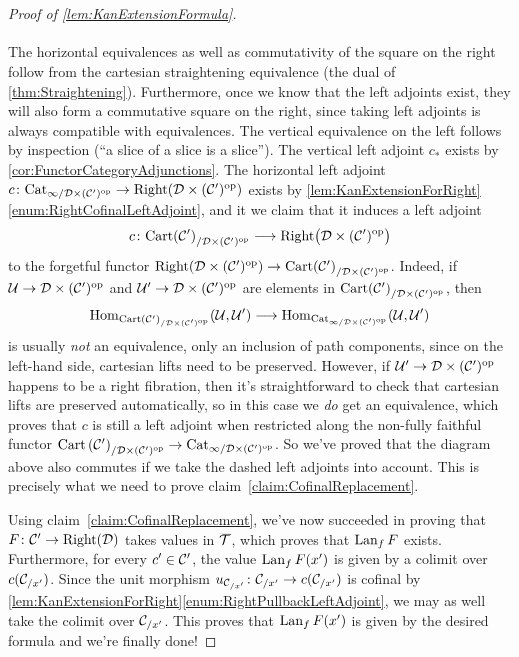 \begin{proof}[Proof of \cref{lem:KanExtensionFormula}]
\begin{equation*}
\begin{tikzcd}
		\end{tikzcd}
	\end{equation*}
	The horizontal equivalences as well as commutativity of the square on the right follow from the cartesian straightening equivalence (the dual of \cref{thm:Straightening}). Furthermore, once we know that the left adjoints exist, they will also form a commutative square on the right, since taking left adjoints is always compatible with equivalences. The vertical equivalence on the left follows by inspection (\enquote{a slice of a slice is a slice}). The vertical left adjoint $c_*$ exists by \cref{cor:FunctorCategoryAdjunctions}. The horizontal left adjoint $c\colon \Cat_{\infty/\Dd\times(\Cc')^\op}\rightarrow \cat{Right}\lef(\Dd\times(\Cc')^\op\righ)$ exists by \cref{lem:KanExtensionForRight}\cref{enum:RightCofinalLeftAdjoint}, and it we claim that it induces a left adjoint
	\begin{equation*}
		c\colon  \cat{Cart}\!\left(\Cc'\right)_{/\Dd\times(\Cc')^\op}\longrightarrow \cat{Right}\lef(\Dd\times(\Cc')^\op\righ)
	\end{equation*}
	to the forgetful functor $\cat{Right}\lef(\Dd\times(\Cc')^\op\righ)\rightarrow \cat{Cart}\!\left(\Cc'\right)_{/\Dd\times(\Cc')^\op}$. Indeed, if $\mathcal{U}\rightarrow \mathcal{D}\times(\mathcal{C}')^{\mathrm{op}}$ and $\mathcal{U}'\rightarrow \mathcal{D}\times(\mathcal{C}')^{\mathrm{op}}$ are elements in $\mathrm{Cart}\!\left(\mathcal{C}'\right)_{/\mathcal{D}\times(\mathcal{C}')^{\mathrm{op}}}$, then
	\begin{equation*}
		\operatorname{Hom}_{\mathrm{Cart}\left(\mathcal{C}'\right)_{/\mathcal{D}\times(\mathcal{C}')^{\mathrm{op}}}}(\mathcal{U},\mathcal{U}')\longrightarrow \operatorname{Hom}_{\mathrm{Cat}_{\infty/\mathcal{D}\times(\mathcal{C}')^{\mathrm{op}}}}(\mathcal{U},\mathcal{U}')
	\end{equation*}
	is usually \emph{not} an equivalence, only an inclusion of path components, since on the left-hand side, cartesian lifts need to be preserved. However, if $\mathcal{U}'\rightarrow \mathcal{D}\times(\mathcal{C}')^{\mathrm{op}}$ happens to be a right fibration, then it's straightforward to check that cartesian lifts are preserved automatically, so in this case we \emph{do} get an equivalence, which proves that $c$ is still a left adjoint when restricted along the non-fully faithful functor $\mathrm{Cart}\left(\mathcal{C}'\right)_{/\mathcal{D}\times(\mathcal{C}')^{\mathrm{op}}}\rightarrow \mathrm{Cat}_{\infty/\mathcal{D}\times(\mathcal{C}')^{\mathrm{op}}}$. So we've proved that the diagram above also commutes if we take the dashed left adjoints into account. This is precisely what we need to prove claim~\cref{claim:CofinalReplacement}.
	
	Using claim~\cref{claim:CofinalReplacement}, we've now succeeded in proving that $F\colon \mathcal{C}'\rightarrow\mathrm{Right}(\mathcal{D})$ takes values in $\ov\Tt$, which proves that $\operatorname{Lan}_fF$ exists. Furthermore, for every $c'\in\mathcal{C}'$, the value $\operatorname{Lan}_fF(x')$ is given by a colimit over $c(\mathcal{C}_{/x'})$. Since the unit morphism $u_{\mathcal{C}_{/x'}}\colon \mathcal{C}_{/x'}\rightarrow c(\mathcal{C}_{/x'})$ is cofinal by \cref{lem:KanExtensionForRight}\cref{enum:RightPullbackLeftAdjoint}, we may as well take the colimit over $\mathcal{C}_{/x'}$. This proves that $\operatorname{Lan}_fF(x')$ is given by the desired formula and we're finally done!		
\end{proof}
